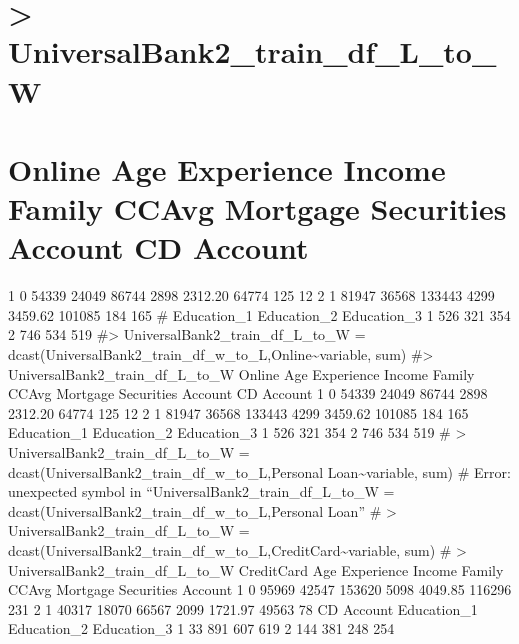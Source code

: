 \documentclass[
]{article}
\begin{document}
\hypertarget{universalbank2_train_df_l_to_w-1}{%
\section{\textgreater{}
UniversalBank2\_train\_df\_L\_to\_W}\label{universalbank2_train_df_l_to_w-1}}

\hypertarget{online-age-experience-income-family-ccavg-mortgage-securities-account-cd-account}{%
\section{Online Age Experience Income Family CCAvg Mortgage Securities
Account CD
Account}\label{online-age-experience-income-family-ccavg-mortgage-securities-account-cd-account}}

1 0 54339 24049 86744 2898 2312.20 64774 125 12 2 1 81947 36568 133443
4299 3459.62 101085 184 165 \# Education\_1 Education\_2 Education\_3 1
526 321 354 2 746 534 519 \#\textgreater{}
UniversalBank2\_train\_df\_L\_to\_W =
dcast(UniversalBank2\_train\_df\_w\_to\_L,Online\textasciitilde variable,
sum) \#\textgreater{} UniversalBank2\_train\_df\_L\_to\_W Online Age
Experience Income Family CCAvg Mortgage Securities Account CD Account 1
0 54339 24049 86744 2898 2312.20 64774 125 12 2 1 81947 36568 133443
4299 3459.62 101085 184 165 Education\_1 Education\_2 Education\_3 1 526
321 354 2 746 534 519 \# \textgreater{}
UniversalBank2\_train\_df\_L\_to\_W =
dcast(UniversalBank2\_train\_df\_w\_to\_L,Personal
Loan\textasciitilde variable, sum) \# Error: unexpected symbol in
``UniversalBank2\_train\_df\_L\_to\_W =
dcast(UniversalBank2\_train\_df\_w\_to\_L,Personal Loan'' \#
\textgreater{} UniversalBank2\_train\_df\_L\_to\_W =
dcast(UniversalBank2\_train\_df\_w\_to\_L,CreditCard\textasciitilde variable,
sum) \# \textgreater{} UniversalBank2\_train\_df\_L\_to\_W CreditCard
Age Experience Income Family CCAvg Mortgage Securities Account 1 0 95969
42547 153620 5098 4049.85 116296 231 2 1 40317 18070 66567 2099 1721.97
49563 78 CD Account Education\_1 Education\_2 Education\_3 1 33 891 607
619 2 144 381 248 254
\end{document}
